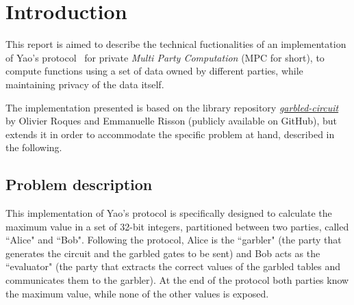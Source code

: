 \section{Introduction}

This report is aimed to describe the technical fuctionalities of an implementation of Yao's protocol~\cite{yao} for private \textit{Multi Party Computation} (MPC for short), to compute functions using a set of data owned by different parties, while maintaining privacy of the data itself.

The implementation presented is based on the library repository \href{https://github.com/ojroques/garbled-circuit}{\textit{garbled-circuit}} by Olivier Roques and Emmanuelle Risson (publicly available on GitHub), but extends it in order to accommodate the specific problem at hand, described in the following.

\subsection{Problem description}

This implementation of Yao's protocol is specifically designed to calculate the maximum value in a set of 32-bit integers, partitioned between two parties, called ``Alice" and ``Bob". Following the protocol, Alice is the ``garbler" (the party that generates the circuit and the garbled gates to be sent) and Bob acts as the ``evaluator" (the party that extracts the correct values of the garbled tables and communicates them to the garbler). At the end of the protocol both parties know the maximum value, while none of the other values is exposed.
